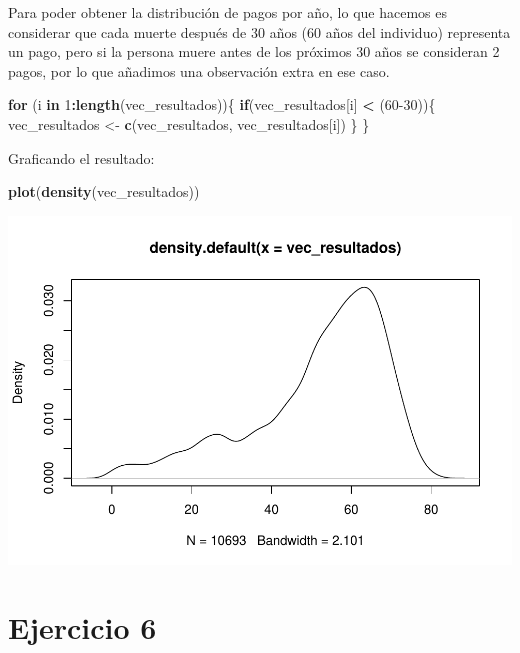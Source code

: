 \documentclass[
]{article}
\newenvironment{Shaded}{\begin{snugshade}}{\end{snugshade}}
\newcommand{\ControlFlowTok}[1]{\textcolor[rgb]{0.13,0.29,0.53}{\textbf{#1}}}
\newcommand{\DecValTok}[1]{\textcolor[rgb]{0.00,0.00,0.81}{#1}}
\newcommand{\FunctionTok}[1]{\textcolor[rgb]{0.13,0.29,0.53}{\textbf{#1}}}
\newcommand{\NormalTok}[1]{#1}
\newcommand{\OtherTok}[1]{\textcolor[rgb]{0.56,0.35,0.01}{#1}}
\newcommand{\SpecialCharTok}[1]{\textcolor[rgb]{0.81,0.36,0.00}{\textbf{#1}}}
\begin{document}
Para poder obtener la distribución de pagos por año, lo que hacemos es
considerar que cada muerte después de 30 años (60 años del individuo)
representa un pago, pero si la persona muere antes de los próximos 30
años se consideran 2 pagos, por lo que añadimos una observación extra en
ese caso.

\begin{Shaded}
\begin{Highlighting}[]
\ControlFlowTok{for}\NormalTok{ (i }\ControlFlowTok{in} \DecValTok{1}\SpecialCharTok{:}\FunctionTok{length}\NormalTok{(vec\_resultados))\{}
  \ControlFlowTok{if}\NormalTok{(vec\_resultados[i] }\SpecialCharTok{\textless{}}\NormalTok{ (}\DecValTok{60{-}30}\NormalTok{))\{}
\NormalTok{    vec\_resultados }\OtherTok{\textless{}{-}} \FunctionTok{c}\NormalTok{(vec\_resultados, vec\_resultados[i])}
\NormalTok{  \}}
\NormalTok{\}}
\end{Highlighting}
\end{Shaded}

Graficando el resultado:

\begin{Shaded}
\begin{Highlighting}[]
\FunctionTok{plot}\NormalTok{(}\FunctionTok{density}\NormalTok{(vec\_resultados))}
\end{Highlighting}
\end{Shaded}

\includegraphics{tarea2_files/figure-latex/unnamed-chunk-10-1.pdf}

\newpage

\hypertarget{ejercicio-6}{%
\section{Ejercicio 6}\label{ejercicio-6}}
\end{document}
